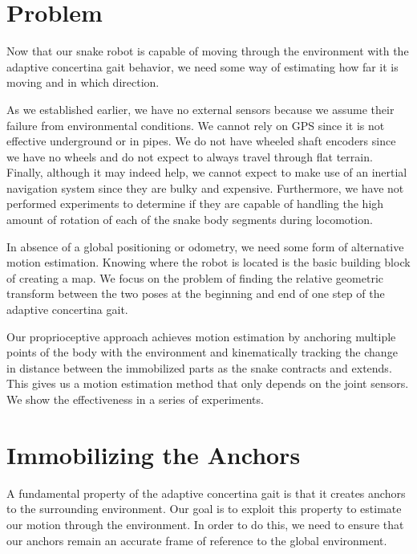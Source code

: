 \section{Problem}


Now that our snake robot is capable of moving through the environment with the adaptive concertina gait behavior, we need some way of estimating how far it is moving and in which direction.

As we established earlier, we have no external sensors because we assume their failure from environmental conditions.  We cannot rely on GPS since it is not effective underground or in pipes.  We do not have wheeled shaft encoders since we have no wheels and do not expect to always travel through flat terrain.  Finally, although it may indeed help, we cannot expect to make use of an inertial navigation system since they are bulky and expensive.  Furthermore, we have not performed experiments to determine if they are capable of handling the high amount of rotation of each of the snake body segments during locomotion.

In absence of a global positioning or odometry, we need some form of alternative motion estimation. Knowing where the robot is located is the basic building block of creating a map.  We focus on the problem of finding the relative geometric transform between the two poses at the beginning and end of one step of the adaptive concertina gait. 

Our proprioceptive approach achieves motion estimation by anchoring multiple points of the body with the environment and kinematically tracking the change in distance between the immobilized parts as the snake contracts and extends.  This gives us a motion estimation method that only depends on the joint sensors.  We show the effectiveness in a series of experiments.
 

\section{Immobilizing the Anchors}

\label{sec:anchors}


A fundamental property of the adaptive concertina gait is that it creates anchors to the surrounding environment.  Our goal is to exploit this property to estimate our motion through the environment.  In order to do this, we need to ensure that our anchors remain an accurate frame of reference to the global environment.

